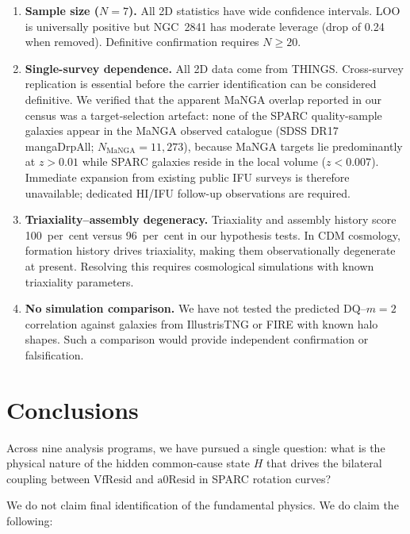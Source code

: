\documentclass[fleqn,usenatbib]{mnras}
\newcommand{\vfresid}{\mathrm{VfResid}}
\newcommand{\aresid}{\mathrm{a0Resid}}
\newcommand{\DQ}{\mathrm{DQ}}
\newcommand{\mtwo}{m{=}2}
\begin{document}
\begin{enumerate}
\item \textbf{Sample size ($N = 7$).}
All 2D statistics have wide confidence intervals.
LOO is universally positive but NGC~2841 has moderate leverage (drop of 0.24 when removed).
Definitive confirmation requires $N \geq 20$.

\item \textbf{Single-survey dependence.}
All 2D data come from THINGS.
Cross-survey replication is essential before the carrier identification can be considered definitive.
We verified that the apparent MaNGA overlap reported in our census was a target-selection artefact: none of the SPARC quality-sample galaxies appear in the MaNGA observed catalogue (SDSS DR17 mangaDrpAll; $N_\mathrm{MaNGA} = 11{,}273$), because MaNGA targets lie predominantly at $z > 0.01$ while SPARC galaxies reside in the local volume ($z < 0.007$).
Immediate expansion from existing public IFU surveys is therefore unavailable; dedicated HI/IFU follow-up observations are required.

\item \textbf{Triaxiality--assembly degeneracy.}
Triaxiality and assembly history score 100~per~cent versus 96~per~cent in our hypothesis tests.
In CDM cosmology, formation history drives triaxiality, making them observationally degenerate at present.
Resolving this requires cosmological simulations with known triaxiality parameters.

\item \textbf{No simulation comparison.}
We have not tested the predicted $\DQ$--$\mtwo$ correlation against galaxies from IllustrisTNG or FIRE with known halo shapes.
Such a comparison would provide independent confirmation or falsification.
\end{enumerate}


\section{Conclusions}
\label{sec:conclusions}

Across nine analysis programs, we have pursued a single question: what is the physical nature of the hidden common-cause state $H$ that drives the bilateral coupling between $\vfresid$ and $\aresid$ in SPARC rotation curves?

We do not claim final identification of the fundamental physics.
We do claim the following:
\end{document}
